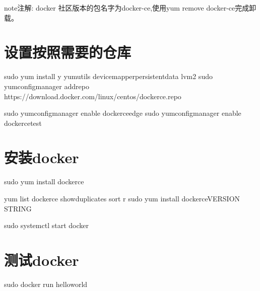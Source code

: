 \documentclass[letterpaper,10pt,english]{sphinxmanual}
\begin{document}
\begin{sphinxadmonition}{note}{注解:}
docker 社区版本的包名字为docker-ce,使用yum remove docker-ce完成卸载。
\end{sphinxadmonition}


\section{设置按照需要的仓库}
\label{\detokenize{_u4e86_u89e3docker/02-_u83b7_u53d6docker_u7684ce_u7248_u672c:id1}}
%
\begin{sphinxVerbatim}[commandchars=\\\{\}]
\PYGZdl{} sudo yum install \PYGZhy{}y yum\PYGZhy{}utils 
device\PYGZhy{}mapper\PYGZhy{}persistent\PYGZhy{}data 
lvm2
\PYGZdl{} sudo yum\PYGZhy{}config\PYGZhy{}manager 
    \PYGZhy{}\PYGZhy{}add\PYGZhy{}repo 
    https://download.docker.com/linux/centos/docker\PYGZhy{}ce.repo

\PYGZdl{} sudo yum\PYGZhy{}config\PYGZhy{}manager \PYGZhy{}\PYGZhy{}enable docker\PYGZhy{}ce\PYGZhy{}edge
\PYGZdl{} sudo yum\PYGZhy{}config\PYGZhy{}manager \PYGZhy{}\PYGZhy{}enable docker\PYGZhy{}ce\PYGZhy{}test
\end{sphinxVerbatim}


\section{安装docker}
\label{\detokenize{_u4e86_u89e3docker/02-_u83b7_u53d6docker_u7684ce_u7248_u672c:id2}}
%
\begin{sphinxVerbatim}[commandchars=\\\{\}]
\PYGZdl{} sudo yum install docker\PYGZhy{}ce

\PYGZdl{} yum list docker\PYGZhy{}ce \PYGZhy{}\PYGZhy{}showduplicates  sort \PYGZhy{}r
\PYGZdl{} sudo yum install docker\PYGZhy{}ce\PYGZhy{}\PYGZlt{}VERSION STRING\PYGZgt{}

\PYGZdl{} sudo systemctl start docker
\end{sphinxVerbatim}


\section{测试docker}
\label{\detokenize{_u4e86_u89e3docker/02-_u83b7_u53d6docker_u7684ce_u7248_u672c:id3}}
%
\begin{sphinxVerbatim}[commandchars=\\\{\}]
\PYGZdl{} sudo docker run hello\PYGZhy{}world
\end{sphinxVerbatim}
\end{document}
